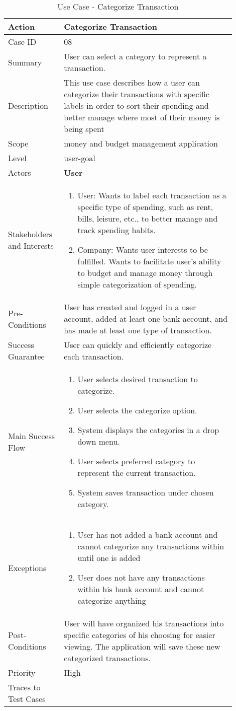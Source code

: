 \documentclass[11pt]{article}
\newcounter{use case ID}
\newcommand\tabularhead[1]{
\begin{table}[ht]
    \addtocounter{use case ID}{1}
    \caption{Use Case \arabic{use case ID} - #1}
    \vspace{0.2cm}
    \begin{tabular}{|p{0.2\linewidth}|p{0.70\linewidth}|}
    \hline
        \textbf{Action} & \textbf{#1} \\
        \hline}
\newcommand\addrow[2]{#1 & #2\\ \hline}
\newcommand\addmulrow[2]{ \begin{minipage}[t][][t]{2.5cm}#1\end{minipage}
        &\begin{minipage}[t][][t]{11cm}
        \begin{enumerate}[itemsep=-1ex] #2   \end{enumerate}
    \end{minipage}\vfill\\ \hline}
\newenvironment{usecase}{\tabularhead}
{\hline\end{tabular}\end{table}}
\begin{document}
\begin{usecase}{Categorize Transaction}
    \addrow{Case ID}{08}
    \addrow{Summary}{User can select a category to represent a transaction.}
    \addrow{Description} {This use case describes how a user can categorize their transactions with specific labels in order to sort their spending and better manage where most of their money is being spent }
     \addrow{Scope}{money and budget management application}
     \addrow{Level}{user-goal}
     \addrow{Actors}{\textbf{User}}
     \addmulrow{Stakeholders and Interests}{
         \item User: Wants to label each transaction as a specific type of spending, such as rent, bills, leisure, etc., to better manage and track spending habits.
         \item Company: Wants user interests to be fulfilled. Wants to facilitate user's ability to budget and manage money through simple categorization of spending.}
     \addrow{Pre-Conditions}{User has created and logged in a user account, added at least one bank account, and has made at least one type of transaction.}
     \addrow{Success Guarantee}{User can quickly and efficiently categorize each transaction.}
     \addmulrow{Main Success Flow}{
         \item User selects desired transaction to categorize.
         \item User selects the categorize option.
         \item System displays the categories in a drop down menu.
         \item User selects preferred category to represent the current transaction.
         \item System saves transaction under chosen category.}
         \addmulrow{Exceptions} {
         \item User has not added a bank account and cannot categorize any transactions within until one is added \item User does not have any transactions within his bank account and cannot categorize anything}
     \addrow{Post-Conditions}{User will have organized his transactions into specific categories of his choosing for easier viewing. The application will save these new categorized transactions.}
     \addrow{Priority}{High}
     \addrow{Traces to Test Cases}{}
     
\end{usecase}
\end{document}

